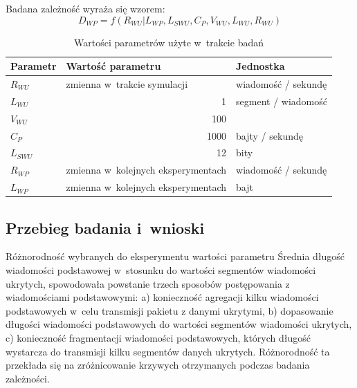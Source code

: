 \documentclass[a4paper, twoside, 12pt]{report}
\begin{document}
            Badana zależność wyraża się wzorem: \\
                $$ D_{WP} = f(R_{WU} | L_{WP}, L_{SWU}, C_P, V_{WU}, L_{WU}, R_{WU}) $$
            \begin{table}[h]
                \centering
                \begin{tabular}{ | l | r | l | }
                    \hline
                    {\bfseries Parametr} & \multicolumn{1}{|l|}{{\bfseries Wartość parametru}} & {\bfseries Jednostka} \\ \hline
                    \( R_{WU} \) & \multicolumn{1}{|l|}{zmienna w~trakcie symulacji} & wiadomość / sekundę \\ \hline
                    \( L_{WU} \) & 1 & segment / wiadomość \\ \hline
                    \( V_{WU} \) & 100 & \\ \hline
                    \( C_P \) & 1000 & bajty / sekundę \\ \hline
                    \( L_{SWU} \) & 12 & bity \\ \hline
                    \( R_{WP} \) & zmienna w~kolejnych eksperymentach & wiadomość / sekundę \\ \hline
                    \( L_{WP} \) & zmienna w~kolejnych eksperymentach & bajt \\ \hline
                \end{tabular}
                \caption{Wartości parametrów użyte w~trakcie badań}
            \end{table}
        \subsection{Przebieg badania i~wnioski}
            Różnorodność wybranych do eksperymentu wartości parametru Średnia długość
            wiadomości podstawowej w~stosunku do wartości segmentów wiadomości ukrytych,
            spowodowała powstanie trzech sposobów postępowania z wiadomościami podstawowymi:
            a) konieczność agregacji kilku wiadomości podstawowych w~celu transmisji pakietu z danymi ukrytymi,
            b) dopasowanie długości wiadomości podstawowych do wartości segmentów wiadomości ukrytych,
            c) konieczność fragmentacji wiadomości podstawowych, których długość wystarcza
            do transmisji kilku segmentów danych ukrytych. Różnorodność ta przekłada
            się na zróżnicowanie krzywych otrzymanych podczas badania zależności.
\end{document}
